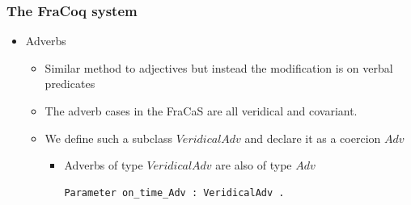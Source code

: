 \documentclass[11pt]{beamer}
\begin{document}
\begin{frame}[fragile]
	\frametitle{The FraCoq system}
	
	\begin{itemize}
		
		\item Adverbs
		
		\begin{itemize}
			
			\item Similar method to adjectives but instead the modification is on verbal predicates
			
			\item The adverb cases in the FraCaS are all veridical and covariant. 
			
			\item We define such a subclass $VeridicalAdv$ and declare it as a coercion $Adv$
			
				\begin{itemize}
					
					\item Adverbs of type $VeridicalAdv$ are also of type $Adv$
			
\begin{verbatim}			
Parameter on_time_Adv : VeridicalAdv .	
\end{verbatim}


			


\end{itemize}\end{itemize}\end{itemize}
\end{frame}
\end{document}
